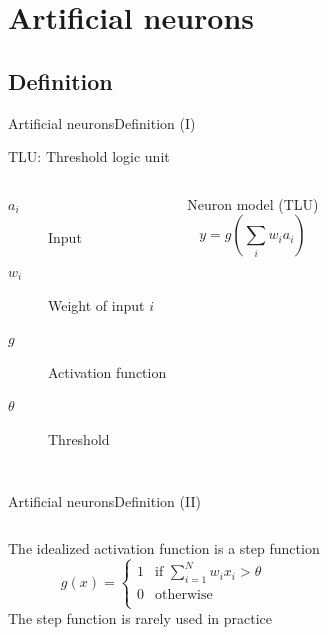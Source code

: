 \documentclass[10pt,compress]{beamer} %
\begin{document}
\section{Artificial neurons}

\subsection{Definition}

\begin{frame}{Artificial neurons}{Definition (I)}

    TLU: Threshold logic unit\\

    

	\bigskip
    \begin{columns}
		\begin{description}
		\item[$a_i$] Input
		\item[$w_{i}$] Weight of input $i$
		\item[$g$] Activation function
		\item[$\theta$] Threshold
		\end{description}

	    \begin{block}{Neuron model (TLU)}
	   \vspace{-0.5cm}
	   \begin{equation*}
	   y=g\left( \sum_{i} w_{i} a_i \right)
	   \end{equation*}
	   \end{block}

    \end{columns}
\end{frame}

\begin{frame}{Artificial neurons}{Definition (II)}
	\begin{columns}
	The idealized activation function is a step function
	\begin{equation*}
	g(x) =
	  \begin{cases}
	      	1  & \text{if } \sum_{i=1}^{N} w_i x_i > \theta\\
	  	0  & \text{otherwise}\\
	  \end{cases}
	\end{equation*}
	The step function is rarely used in practice

 	\end{columns}

\end{frame}
\end{document}
